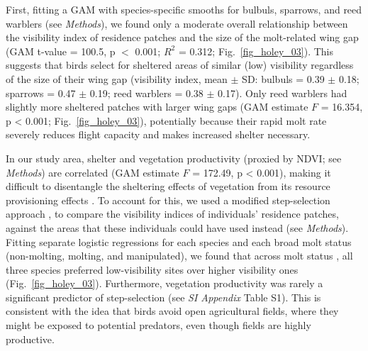 \begin{refsection}
First, fitting a GAM with species-specific smooths for bulbuls, sparrows, and reed warblers (see \textit{Methods}), we found only a moderate overall relationship between the visibility index of residence patches and the size of the molt-related wing gap (GAM t-value = 100.5, p $<$ 0.001; $R^2$ = 0.312; Fig.~\ref{fig_holey_03}).
This suggests that birds select for sheltered areas of similar (low) visibility regardless of the size of their wing gap (visibility index, mean $\pm$ SD: bulbuls =  0.39 $\pm$ 0.18; sparrows = 0.47 $\pm$ 0.19; reed warblers = 0.38 $\pm$ 0.17).
Only reed warblers had slightly more sheltered patches with larger wing gaps (GAM estimate $F$ = 16.354, p < 0.001; Fig.~\ref{fig_holey_03}), potentially because their rapid molt rate severely reduces flight capacity and makes increased shelter necessary.

In our study area, shelter and vegetation productivity (proxied by NDVI; see \textit{Methods}) are correlated (GAM estimate $F$ = 172.49, p < 0.001), making it difficult to disentangle the sheltering effects of vegetation from its resource provisioning effects \cite{pettorelli2011}.
To account for this, we used a modified step-selection approach \cite{avgar2016,signer2019,aben2021}, to compare the visibility indices of individuals' residence patches, against the areas that these individuals could have used instead (see \textit{Methods}).
Fitting separate logistic regressions for each species and each broad molt status (non-molting, molting, and manipulated), we found that across molt status , all three species preferred low-visibility sites over higher visibility ones (Fig.~\ref{fig_holey_03}).
Furthermore, vegetation productivity was rarely a significant predictor of step-selection (see \textit{SI Appendix} Table {S1}).
This is consistent with the idea that birds avoid open agricultural fields, where they might be exposed to potential predators, even though fields are highly productive.


\end{refsection}
